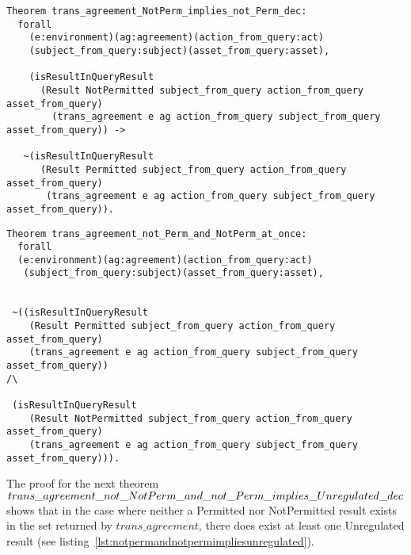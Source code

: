 \begin{lstlisting}
Theorem trans_agreement_NotPerm_implies_not_Perm_dec:
  forall
    (e:environment)(ag:agreement)(action_from_query:act)
    (subject_from_query:subject)(asset_from_query:asset),

    (isResultInQueryResult 
      (Result NotPermitted subject_from_query action_from_query asset_from_query)
        (trans_agreement e ag action_from_query subject_from_query asset_from_query)) ->

   ~(isResultInQueryResult 
      (Result Permitted subject_from_query action_from_query asset_from_query)
       (trans_agreement e ag action_from_query subject_from_query asset_from_query)).
\end{lstlisting}


\begin{lstlisting}
Theorem trans_agreement_not_Perm_and_NotPerm_at_once:
  forall
  (e:environment)(ag:agreement)(action_from_query:act)
   (subject_from_query:subject)(asset_from_query:asset),


 ~((isResultInQueryResult 
    (Result Permitted subject_from_query action_from_query asset_from_query)
    (trans_agreement e ag action_from_query subject_from_query asset_from_query)) 
/\

 (isResultInQueryResult 
    (Result NotPermitted subject_from_query action_from_query asset_from_query)
    (trans_agreement e ag action_from_query subject_from_query asset_from_query))).

\end{lstlisting}

The proof for the next theorem $trans\_agreement\_not\_NotPerm\_and\_not\_Perm \newline \_implies\_Unregulated\_dec$ shows that in the case where neither a Permitted nor NotPermitted result exists in the set returned by $trans\_agreement$, there does exist at least one Unregulated result (see listing~\ref{lst:notpermandnotpermimpliesunregulated}).

